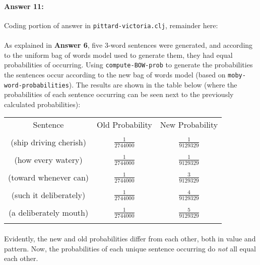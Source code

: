 \documentclass[10pt]{article}
\begin{document}
\paragraph{Answer 11:} Coding portion of answer in 
\texttt{pittard-victoria.clj}, remainder here:

\paragraph{} As explained in \textbf{Answer 6}, five 3-word sentences were generated, and according to the uniform bag of words model used to generate them, they had equal probabilities of occurring. Using \texttt{compute-BOW-prob} to generate the probabilities the sentences occur according to the new bag of words model (based on \texttt{moby-word-probabilities}). The results are shown in the table below (where the probabilities of each sentence occurring can be seen next to the previously calculated probabilities):

\begin{center}
    \begin{tabular}{|c|c|c|}
    \hline
    Sentence & Old Probability & New Probability\\ & &  \\
    \hline
    (ship driving cherish) & $\frac{1}{2744000}$ & $\frac{1}{9129329}$\\ & & \\
    \hline
    (how every watery) & $\frac{1}{2744000}$ & $\frac{1}{9129329}$\\ & & \\
    \hline
    (toward whenever can) & $\frac{1}{2744000}$ & $\frac{3}{9129329}$\\ & & \\
    \hline
    (such it deliberately) & $\frac{1}{2744000}$ & $\frac{4}{9129329}$\\ & & \\
    \hline
    (a deliberately mouth) & $\frac{1}{2744000}$ & $\frac{5}{9129329}$\\ & & \\
    \hline
    \end{tabular}
\end{center}

\paragraph{} Evidently, the new and old probabilities differ from each other, both in value and pattern. Now, the probabilities of each unique sentence occurring do \textit{not} all equal each other.
\end{document}
